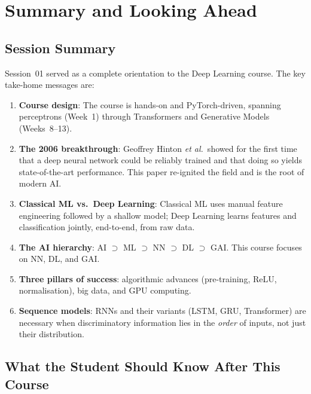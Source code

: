 \documentclass[12pt,a4paper]{article}
\begin{document}
\section{Summary and Looking Ahead}
\label{sec:summary}

\subsection{Session Summary}
\label{subsec:session_summary}

Session~01 served as a complete orientation to the Deep Learning course.
The key take-home messages are:

\begin{enumerate}[label=\textbf{T\arabic*.}]
  \item \textbf{Course design}: The course is hands-on and PyTorch-driven,
        spanning perceptrons (Week~1) through Transformers and Generative
        Models (Weeks~8--13).
  \item \textbf{The 2006 breakthrough}: Geoffrey Hinton \emph{et al.}\ showed
        for the first time that a deep neural network could be reliably trained
        and that doing so yields state-of-the-art performance.  This paper
        re-ignited the field and is the root of modern AI.
  \item \textbf{Classical ML vs.\ Deep Learning}: Classical ML uses manual
        feature engineering followed by a shallow model; Deep Learning learns
        features and classification jointly, end-to-end, from raw data.
  \item \textbf{The AI hierarchy}: AI $\supset$ ML $\supset$ NN $\supset$ DL
        $\supset$ GAI.  This course focuses on NN, DL, and GAI.
  \item \textbf{Three pillars of success}: algorithmic advances
        (pre-training, ReLU, normalisation), big data, and GPU computing.
  \item \textbf{Sequence models}: RNNs and their variants (LSTM, GRU,
        Transformer) are necessary when discriminatory information lies in
        the \emph{order} of inputs, not just their distribution.
\end{enumerate}

\subsection{What the Student Should Know After This Course}
\label{subsec:takeaway}
\end{document}
